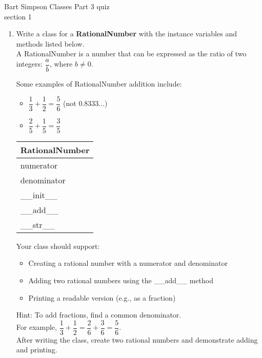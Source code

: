 \documentclass{article}
\begin{document}
\pagebreak
Bart Simpson \hfill Classes Part 3 quiz\\
section 1\\
\begin{enumerate}
	\item
		Write a class for a \textbf{RationalNumber} with the instance variables and methods 
		listed below.\\
		A RationalNumber is a number that can be expressed as the ratio of two integers: 
		$\dfrac{a}{b}$, where $b \ne 0$.

		\begin{minipage}[t]{0.65\textwidth}
			Some examples of RationalNumber addition include:
			\begin{itemize}
				\item $\dfrac{1}{3} + \dfrac{1}{2} = \dfrac{5}{6}$ (not $0.8333\ldots$)
				\item $\dfrac{2}{5} + \dfrac{1}{5} = \dfrac{3}{5}$
			\end{itemize}
		\end{minipage}
		\hfill
		\begin{minipage}[t]{0.32\textwidth}
			\vspace{.2em}
			\begin{flushright}
				\begin{tabular}{|l|}
				\hline
				RationalNumber \\ \hline
				numerator \\
				denominator \\ \hline
				\_\_init\_\_ \\
				\_\_add\_\_ \\
				\_\_str\_\_ \\ \hline
				\end{tabular}
			\end{flushright}
		\end{minipage}
		
		Your class should support:
		\begin{itemize}
			\item Creating a rational number with a numerator and denominator
			\item Adding two rational numbers using the \_\_add\_\_ method 
			\item Printing a readable version (e.g., as a fraction)
		\end{itemize}
		
		Hint: To add fractions, find a common denominator.\\
		For example, $\dfrac{1}{3} + \dfrac{1}{2} = \dfrac{2}{6} + \dfrac{3}{6} = \dfrac{5}{6}$.\\
		\newline
		After writing the class, create two rational numbers and demonstrate adding and printing.




\end{enumerate}
\end{document}
